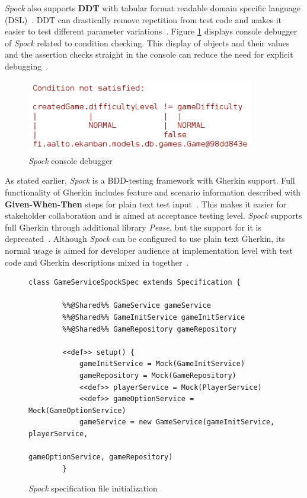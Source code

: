     \textit{Spock} also supports \textbf{DDT} with tabular format readable
    domain specific language (DSL)~\cite{spock}.
    DDT can drastically remove repetition from test code and makes it easier to test different parameter
    variations~\cite{kapelonis2016java}.
    Figure \ref{fig:spock-debug} displays console debugger of \textit{Spock} related to
    condition checking. This display of objects and their values and the assertion checks straight in the console
    can reduce the need for explicit debugging~\cite{kapelonis2016java}.
    \begin{figure}[ht]
      \begin{center}
        \begin{topbot}[style=mdstyle]
        \includegraphics[width=10cm]{images/spock-debug.png}
        \end{topbot}
        \caption{\textit{Spock} console debugger}
        \label{fig:spock-debug}
      \end{center}
    \end{figure}

    As stated earlier, \textit{Spock} is a BDD-testing framework with Gherkin support.
    Full functionality of Gherkin includes feature and scenario information described
    with \textbf{Given-When-Then} steps for plain text test input~\cite{gherkin}. This makes it easier for stakeholder collaboration
    and is aimed at acceptance testing level.
    \textit{Spock} supports full Gherkin through additional library \textit{Pease}, but the support for it is deprecated~\cite{spock-pease}.
    Although \textit{Spock} can be configured to use plain text Gherkin, its normal usage is aimed for developer audience at implementation
    level with test code and Gherkin descriptions mixed in together~\cite{okolnychyi2016study}.

    \begin{figure}[ht]
        \begin{lstlisting}[style=java]
    class GameServiceSpockSpec extends Specification {

        %%@Shared%% GameService gameService
        %%@Shared%% GameInitService gameInitService
        %%@Shared%% GameRepository gameRepository

        <<def>> setup() {
            gameInitService = Mock(GameInitService)
            gameRepository = Mock(GameRepository)
            <<def>> playerService = Mock(PlayerService)
            <<def>> gameOptionService = Mock(GameOptionService)
            gameService = new GameService(gameInitService, playerService,
                                          gameOptionService, gameRepository)
        }
        \end{lstlisting}
        \caption{\textit{Spock} specification file initialization}
        \label{fig:spock-init}
    \end{figure}

